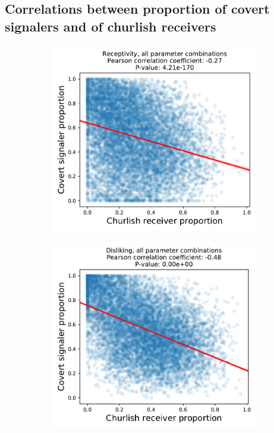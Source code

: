 \documentclass[11pt,letterpaper]{article}
\begin{document}
\subsection{Correlations between proportion of covert signalers and of churlish receivers}

\begin{figure}[H]
  \centering
  \begin{subfigure}{0.49\textwidth}
    \centering
    \includegraphics[width=\textwidth]{prelim/Figures/receptivity_allcombos_reg.pdf}
    \caption{}
    \label{fig:}
  \end{subfigure}
  \begin{subfigure}{0.49\textwidth}
    \centering
    \includegraphics[width=\textwidth]{prelim/Figures/disliking_allcombos_reg.pdf}

\end{subfigure}
\end{figure}
\end{document}
